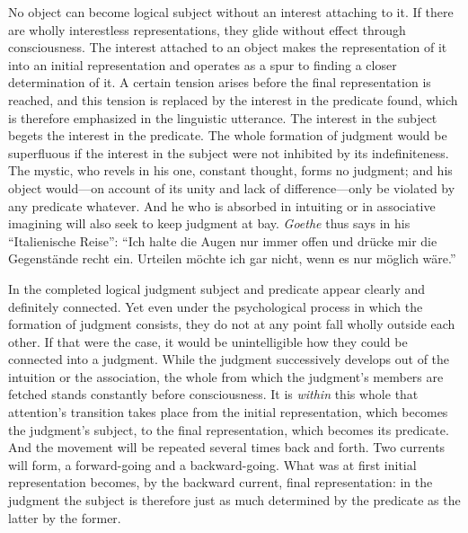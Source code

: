 \documentclass[12pt,a4paper]{book}
\newcommand{\opage}[1]{\marginnote{\footnotesize\textit{[#1]}}}
\begin{document}
No object can become logical subject without an interest attaching to it.
If there are wholly interestless representations, they glide without
effect through consciousness. The interest attached to an object makes the
representation of it into an initial representation and operates as a spur
to finding a closer determination of it. A certain tension arises before
the final representation is reached, and this tension is replaced by the
interest in the predicate found, which is therefore emphasized in the
linguistic utterance. The interest in the subject begets the interest in
the predicate. The whole formation of judgment \opage{92}would be superfluous if the
interest in the subject were not inhibited by its indefiniteness. The
mystic, who revels in his one, constant thought, forms no judgment; and
his object would---on account of its unity and lack of difference---only
be violated by any predicate whatever. And he who is absorbed in intuiting
or in associative imagining will also seek to keep judgment at bay.
\emph{Goethe} thus says in his ``Italienische Reise'': ``Ich halte die
Augen nur immer offen und drücke mir die Gegenstände recht ein. Urteilen
möchte ich gar nicht, wenn es nur möglich wäre.''

In the completed logical judgment subject and predicate appear clearly and
definitely connected. Yet even under the psychological process in which the
formation of judgment consists, they do not at any point fall wholly
outside each other. If that were the case, it would be unintelligible how
they could be connected into a judgment. While the judgment successively
develops out of the intuition or the association, the whole from which the
judgment's members are fetched stands constantly before consciousness. It is \emph{within} this whole that attention's transition takes place from the
initial representation, which becomes the judgment's subject, to the final
representation, which becomes its predicate. And the movement will be
repeated several times back and forth. Two currents will form, a
forward-going and a backward-going. What was at first initial
representation becomes, by the backward current, final representation: in
the judgment the subject is therefore just as much determined by the
predicate as the latter by the former.
\end{document}
